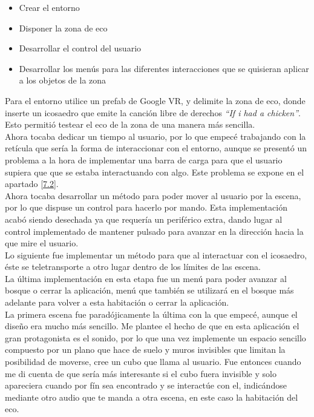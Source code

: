 \begin{itemize}
	\item Crear el entorno
	\item Disponer la zona de eco
	\item Desarrollar el control del usuario
	\item Desarrollar los menús para las diferentes interacciones que se quisieran aplicar a los objetos de la zona
\end{itemize}

\quad Para el entorno utilice un prefab de Google VR, y delimite la zona de eco, donde inserte un icosaedro que emite la canción libre de derechos \textit{“If i had a chicken”}. Esto permitió testear el eco de la zona de una manera más sencilla.\\

\quad Ahora tocaba dedicar un tiempo al usuario, por lo que empecé trabajando con la retícula que sería la forma de interaccionar con el entorno, aunque se presentó un problema a la hora de implementar una barra de carga para que el usuario supiera que que se estaba interactuando con algo. Este problema se expone en el apartado \eqref{7.2}.\\

\quad Ahora tocaba desarrollar un método para poder mover al usuario por la escena, por lo que dispuse un control para hacerlo por mando. Esta implementación acabó siendo desechada ya que requería un periférico extra, dando lugar al control implementado de mantener pulsado para avanzar en la dirección hacia la que mire el usuario.\\

\quad Lo siguiente fue implementar un método para que al interactuar con el icosaedro, éste se teletransporte a otro lugar dentro de los límites de las escena.\\

\quad La última implementación en esta etapa fue un menú para poder avanzar al bosque o cerrar la aplicación, menú que también se utilizará en el bosque más adelante para volver a esta habitación o cerrar la aplicación.\\ 

\quad La primera escena fue paradójicamente la última con la que empecé, aunque el diseño era mucho más sencillo. Me plantee el hecho de que en esta aplicación el gran protagonista es el sonido, por lo que una vez implemente un espacio sencillo compuesto por un plano que hace de suelo y muros invisibles que limitan la posibilidad de moverse, cree un cubo que llama al usuario. Fue entonces cuando me di cuenta de que sería más interesante si el cubo fuera invisible y solo apareciera cuando por fín sea encontrado y se interactúe con el, indicándose mediante otro audio que te manda a otra escena, en este caso la habitación del eco.\\

